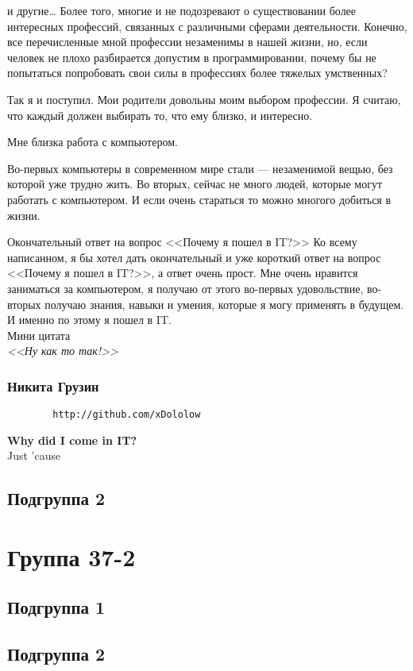 \documentclass[14pt,a4paper,oneside]{extbook}
\begin{document}
		и другие…
		Более того, многие и не подозревают о существовании более интересных профессий, связанных с различными сферами деятельности. Конечно, все перечисленные мной профессии незаменимы в нашей жизни, но, если человек не плохо разбирается допустим в программировании, почему бы не попытаться попробовать свои силы в профессиях более тяжелых умственных?
		
		Так я и поступил. Мои родители довольны моим выбором профессии. Я считаю, что каждый должен выбирать то, что ему близко, и интересно.
		
		Мне близка работа с компьютером.
		
		Во-первых компьютеры в современном мире стали --- незаменимой вещью, без которой уже трудно жить.
		Во вторых, сейчас не много людей, которые могут работать с компьютером.
		И если очень стараться то можно многого добиться в жизни.
		
		Окончательный ответ на вопрос <<Почему я пошел в IT?>>
		Ко всему написанном, я бы хотел дать окончательный и уже короткий ответ на вопрос <<Почему я пошел в IT?>>, а ответ очень прост. Мне очень нравится заниматься за компьютером, я получаю от этого во-первых удовольствие, во-вторых получаю знания, навыки и умения, которые я могу применять в будущем. И именно по этому я пошел в IT.\\
		
		\noindent Мини цитата\\
		\textit {<<Ну как то так!>>}\\
		
		\subsection{Никита Грузин}
		\begin{verbatim}
		http://github.com/xDololow
		\end{verbatim}
		
		\noindent\textbf{Why did I come in IT?}\\
		
		\Large{Just 'cause}
		
		
		
		
		\section{Подгруппа 2}
	\chapter{Группа 37-2}
		\section{Подгруппа 1}
		\section{Подгруппа 2}

	
\end{document}
